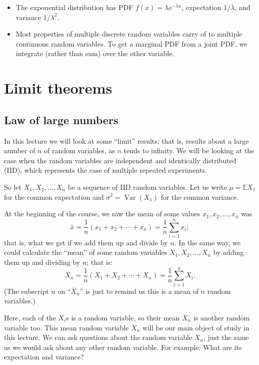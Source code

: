 \documentclass[
  a4paper,
]{book}
\providecommand{\tightlist}{%
  \setlength{\itemsep}{0pt}\setlength{\parskip}{0pt}}
\theoremstyle{definition}
\theoremstyle{definition}
\theoremstyle{definition}
\theoremstyle{definition}
\theoremstyle{remark}
\begin{document}
\begin{itemize}
\tightlist
\item
  The exponential distribution has PDF \(f(x) = \lambda \mathrm e^{-\lambda x}\), expectation \(1/\lambda\), and variance \(1/\lambda^2\).
\item
  Most properties of multiple discrete random variables carry of to multiple continuous random variables. To get a marginal PDF from a joint PDF, we integrate (rather than sum) over the other variable.
\end{itemize}

\hypertarget{L18-limit}{%
\chapter{Limit theorems}\label{L18-limit}}

\hypertarget{lln}{%
\section{Law of large numbers}\label{lln}}

In this lecture we will look at some ``limit'' results; that is, results about a large number of \(n\) of random variables, as \(n\) tends to infinity. We will be looking at the case when the random variables are independent and identically distributed (IID), which represents the case of multiple repeated experiments.

So let \(X_1, X_2, \dots, X_n\) be a sequence of IID random variables. Let us write \(\mu = \mathbb EX_1\) for the common expectation and \(\sigma^2 = \operatorname{Var}(X_1)\) for the common variance.

At the beginning of the course, we saw the mean of some values \(x_1, x_2, \dots, x_n\) was
\[ \bar x = \frac{1}{n} (x_1 + x_2 + \cdots + x_n) = \frac{1}{n} \sum_{i=1}^n x_i ; \]
that is, what we get if we add them up and divide by \(n\). In the same way, we could calculate the ``mean'' of some random variables \(X_1, X_2, \dots, X_n\) by adding them up and dividing by \(n\); that is:
\[ \overline X_n = \frac{1}{n} (X_1 + X_2 + \cdots + X_n) = \frac{1}{n} \sum_{i=1}^n X_i . \]
(The subscript \(n\) on ``\(\overline X_n\)'' is just to remind us this is a mean of \(n\) random variables.)

Here, each of the \(X_i\)s is a random variable, so their mean \(\overline X_n\) is another random variable too. This mean random variable \(\overline X_n\) will be our main object of study in this lecture. We can ask questions about the random variable \(\overline X_n\), just the same as we would ask about any other random variable. For example: What are its expectation and variance?
\end{document}
